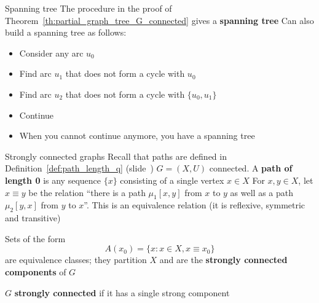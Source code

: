 \documentclass[aspectratio=43]{beamer}
\begin{document}
\begin{frame}{Spanning tree}
The procedure in the proof of Theorem~\ref{th:partial_graph_tree_G_connected} gives a \textbf{spanning tree}
\vfill
Can also build a spanning tree as follows:
\begin{itemize}
\item Consider any arc $u_0$
\item Find arc $u_1$ that does not form a cycle with $u_0$
\item Find arc $u_2$ that does not form a cycle with $\{u_0,u_1\}$
\item Continue
\item When you cannot continue anymore, you have a spanning tree
\end{itemize}
\end{frame}


\begin{frame}{Strongly connected graphs}
Recall that paths are defined in Definition~\ref{def:path_length_q} (slide~\pageref{def:path_length_q})
\vfill
$G=(X,U)$ connected. 
A \textbf{path of length 0} is any sequence $\{x\}$ consisting of a single vertex $x\in X$
\vfill
For $x,y\in X$, let $x\equiv y$ be the relation ``there is a path $\mu_1[x,y]$ from $x$ to $y$ as well as a path $\mu_2[y,x]$ from $y$ to $x$''. This is an equivalence relation (it is reflexive, symmetric and transitive)
\vfill
\begin{definition}\label{def:strong_components}
Sets of the form 
\[
A(x_0)=\{x:x\in X, x\equiv x_0\}	
\]
are equivalence classes; they partition $X$ and are the \textbf{strongly connected components} of $G$	
\end{definition}
\vfill
\begin{definition}
\label{def:strongly_connected_graph}
$G$ \textbf{strongly connected} if it has a single strong component
\end{definition}
\end{frame}
\end{document}
